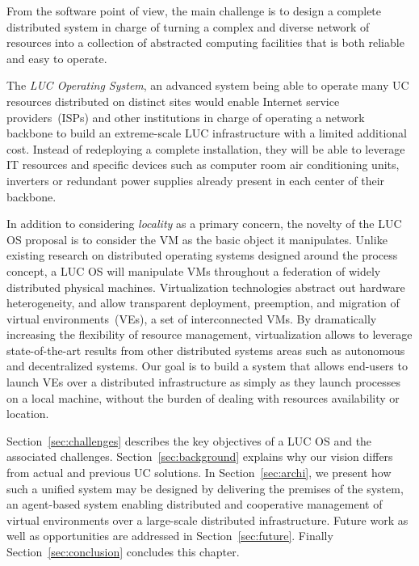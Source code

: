 From the software point of view, the main challenge is to design a complete distributed
system in charge of turning a complex and diverse network of resources into a collection
of abstracted computing facilities that is both reliable and easy to operate.

\begin{svgraybox}
The \emph{LUC Operating System}, an advanced system being able to operate 
many UC resources distributed on distinct sites  would enable 
Internet service providers~(ISPs) and other institutions in
charge of operating a network backbone to build an extreme-scale
LUC infrastructure with a limited additional cost. Instead of redeploying a
complete installation, they will be able to leverage IT resources and
specific devices such as computer room air conditioning units, inverters or
redundant power supplies already present in each center of their
backbone. 
\end{svgraybox}


\medskip

In addition to considering \emph{locality} as a primary concern, the novelty of the LUC OS
proposal is to consider the VM as the basic object it manipulates.  Unlike existing
research on distributed operating systems designed around the process concept, a LUC OS will manipulate VMs throughout a federation of widely distributed
physical machines. Virtualization technologies abstract out hardware heterogeneity, and allow
transparent deployment, preemption, and migration of virtual
environments~(VEs), \ie a set of interconnected VMs.
By dramatically increasing the flexibility of resource management, virtualization 
allows to leverage state-of-the-art results from other distributed
systems areas such as autonomous and decentralized systems.  
Our goal is to build a system that allows end-users to launch VEs over a
distributed infrastructure as simply as they launch processes on a
local machine, \ie  without the burden of dealing with resources
availability or location.

Section~\ref{sec:challenges} describes the key objectives of a LUC OS and the associated challenges. 
Section~\ref{sec:background} explains why our vision differs from actual and previous UC solutions. In
Section~\ref{sec:archi}, we present how such a unified system may be designed
by delivering the premises of the \discovery system, an agent-based system
enabling distributed and cooperative management of virtual environments over a
large-scale distributed infrastructure.
Future work as well as opportunities  are addressed in Section~\ref{sec:future}. Finally Section~\ref{sec:conclusion} concludes this chapter. 
